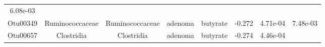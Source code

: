 \documentclass[11pt,]{article}
\begin{document}
\begin{longtable}[]{@{}cccccccc@{}}
\begin{minipage}[t]{0.08\columnwidth}
6.08e-03\strut
\end{minipage}\tabularnewline
\begin{minipage}[t]{0.08\columnwidth}\centering\strut
Otu00349\strut
\end{minipage} & \begin{minipage}[t]{0.15\columnwidth}\centering\strut
Ruminococcaceae\strut
\end{minipage} & \begin{minipage}[t]{0.15\columnwidth}\centering\strut
Ruminococcaceae\strut
\end{minipage} & \begin{minipage}[t]{0.08\columnwidth}\centering\strut
adenoma\strut
\end{minipage} & \begin{minipage}[t]{0.09\columnwidth}\centering\strut
butyrate\strut
\end{minipage} & \begin{minipage}[t]{0.07\columnwidth}\centering\strut
-0.272\strut
\end{minipage} & \begin{minipage}[t]{0.08\columnwidth}\centering\strut
4.71e-04\strut
\end{minipage} & \begin{minipage}[t]{0.08\columnwidth}\centering\strut
7.48e-03\strut
\end{minipage}\tabularnewline
\begin{minipage}[t]{0.08\columnwidth}\centering\strut
Otu00657\strut
\end{minipage} & \begin{minipage}[t]{0.15\columnwidth}\centering\strut
Clostridia\strut
\end{minipage} & \begin{minipage}[t]{0.15\columnwidth}\centering\strut
Clostridia\strut
\end{minipage} & \begin{minipage}[t]{0.08\columnwidth}\centering\strut
adenoma\strut
\end{minipage} & \begin{minipage}[t]{0.09\columnwidth}\centering\strut
butyrate\strut
\end{minipage} & \begin{minipage}[t]{0.07\columnwidth}\centering\strut
-0.274\strut
\end{minipage} & \begin{minipage}[t]{0.08\columnwidth}\centering\strut
4.46e-04\strut
\end{minipage} & \begin{minipage}[t]{0.08\columnwidth}\centering\strut

\end{minipage}
\end{longtable}
\end{document}
